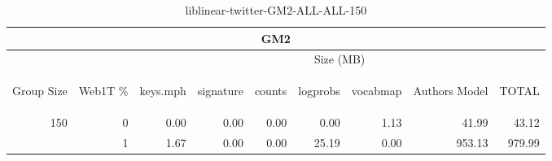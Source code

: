 \begin{center}
\begin{table}[htbp]
\begin{tabular}{ | r | r | r | r | r | r | r | r | r |}
\hline
\multicolumn{9}{|c|}{GM2}\\
\hline
 & & \multicolumn{7}{|c|}{Size (MB)}\\ \cline{3-9}
\begin{sideways}Group Size\end{sideways} & \begin{sideways}Web1T \% \end{sideways} & \begin{sideways}keys.mph\end{sideways} & \begin{sideways}signature\end{sideways} & \begin{sideways}counts\end{sideways} & \begin{sideways}logprobs\end{sideways} & \begin{sideways}vocabmap\end{sideways} & \begin{sideways}Authors Model \end{sideways} & \begin{sideways}TOTAL\end{sideways}\\
\hline
\multirow{1}{*}{150}
 & 0 & 0.00 & 0.00 & 0.00 & 0.00 & 1.13 & 41.99 & 43.12\\ \cline{2-9}
 & 1 & 1.67 & 0.00 & 0.00 & 25.19 & 0.00 & 953.13 & 979.99\\ \cline{2-9}
\hline
\end{tabular}
\caption{liblinear-twitter-GM2-ALL-ALL-150}
\label{table:liblinear-twitter-GM2-ALL-ALL-150}
\end{table}
\end{center}

